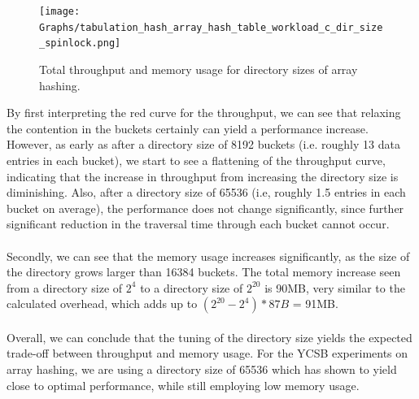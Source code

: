 \documentclass[11pt]{report} %
\begin{document}
\begin{figure}[H]
  \centering
  \texttt{[image: Graphs/tabulation\_hash\_array\_hash\_table\_workload\_c\_dir\_size\_spinlock.png]}\\
  \caption{Total throughput and memory usage for directory sizes of array hashing.}\label{fig:dir_size}
\end{figure}
\noindent
By first interpreting the red curve for the throughput, we can see that relaxing the contention in the buckets certainly can yield a performance increase. However, as early as after a directory size of 8192 buckets (i.e. roughly 13 data entries in each bucket), we start to see a flattening of the throughput curve, indicating that the increase in throughput from increasing the directory size is diminishing. Also, after a directory size of 65536 (i.e, roughly 1.5 entries in each bucket on average), the performance does not change significantly, since further significant reduction in the traversal time through each bucket cannot occur.\\
\\
Secondly, we can see that the memory usage increases significantly, as the size of the directory grows larger than 16384 buckets. The total memory increase seen from a directory size of $2^4$ to a directory size of $2^{20}$ is 90MB, very similar to the calculated overhead, which adds up to $(2^{20}-2^{4})*87B$ = 91MB.\\
\\
Overall, we can conclude that the tuning of the directory size yields the expected trade-off between throughput and memory usage. For the YCSB experiments on array hashing, we are using a directory size of 65536 which has shown to yield close to optimal performance, while still employing low memory usage.
\end{document}
